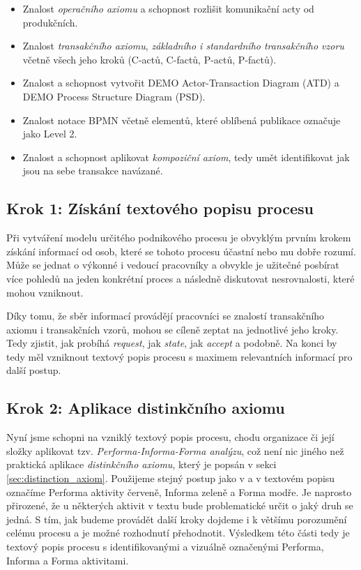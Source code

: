 \documentclass[]{article}
\begin{document}
\begin{itemize}
\item Znalost \textit{operačního axiomu} a schopnost rozlišit komunikační acty od produkčních.
\item Znalost \textit{transakčního axiomu}, \textit{základního i standardního transakčního vzoru} včetně všech jeho kroků (C-actů, C-factů, P-actů, P-factů).
\item Znalost a schopnost vytvořit DEMO Actor-Transaction Diagram (ATD) a DEMO Process Structure Diagram (PSD).
\item Znalost notace BPMN včetně elementů, které oblíbená publikace \cite{Silver2011} označuje jako Level 2.
\item Znalost a schopnost aplikovat \textit{kompoziční axiom}, tedy umět identifikovat jak jsou na sebe transakce navázané.
\end{itemize}

\subsection{Krok 1: Získání textového popisu procesu}
Při vytváření modelu určitého podnikového procesu je obvyklým prvním krokem získání informací od osob, které se tohoto procesu účastní nebo mu dobře rozumí. Může se jednat o výkonné i vedoucí pracovníky a obvykle je užitečné posbírat více pohledů na jeden konkrétní proces a následně diskutovat nesrovnalosti, které mohou vzniknout.

Díky tomu, že sběr informací provádějí pracovníci se znalostí transakčního axiomu i transakčních vzorů, mohou se cíleně zeptat na jednotlivé jeho kroky. Tedy zjistit, jak probíhá \textit{request}, jak \textit{state}, jak \textit{accept} a podobně. Na konci by tedy měl vzniknout textový popis procesu s maximem relevantních informací pro další postup.

\subsection{Krok 2: Aplikace distinkčního axiomu}
Nyní jsme schopni na vzniklý textový popis procesu, chodu organizace či její složky aplikovat tzv. \textit{Performa-Informa-Forma analýzu}, což není nic jiného než praktická aplikace \textit{distinkčního axiomu}, který je popsán v sekci \ref{sec:distinction_axiom}. Použijeme stejný postup jako v \cite{Dietz2006} a v textovém popisu označíme Performa aktivity červeně, Informa zeleně a Forma modře. Je naprosto přirozené, že u některých aktivit v textu bude problematické určit o jaký druh se jedná. S tím, jak budeme provádět další kroky dojdeme i k většímu porozumění celému procesu a je možné rozhodnutí přehodnotit. Výsledkem této části tedy je textový popis procesu s identifikovanými a vizuálně označenými Performa, Informa a Forma aktivitami.
\end{document}
